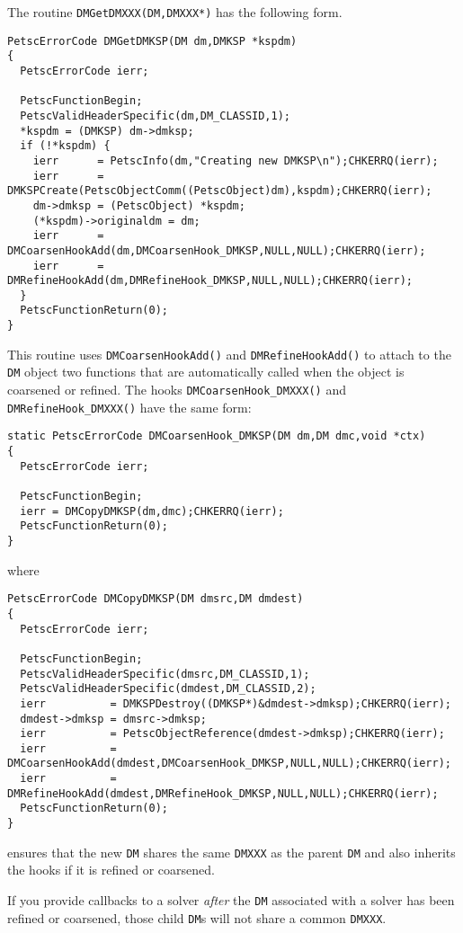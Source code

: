 The routine \lstinline{DMGetDMXXX(DM,DMXXX*)} has the following form.
\begin{lstlisting}
PetscErrorCode DMGetDMKSP(DM dm,DMKSP *kspdm)
{
  PetscErrorCode ierr;

  PetscFunctionBegin;
  PetscValidHeaderSpecific(dm,DM_CLASSID,1);
  *kspdm = (DMKSP) dm->dmksp;
  if (!*kspdm) {
    ierr      = PetscInfo(dm,"Creating new DMKSP\n");CHKERRQ(ierr);
    ierr      = DMKSPCreate(PetscObjectComm((PetscObject)dm),kspdm);CHKERRQ(ierr);
    dm->dmksp = (PetscObject) *kspdm;
    (*kspdm)->originaldm = dm;
    ierr      = DMCoarsenHookAdd(dm,DMCoarsenHook_DMKSP,NULL,NULL);CHKERRQ(ierr);
    ierr      = DMRefineHookAdd(dm,DMRefineHook_DMKSP,NULL,NULL);CHKERRQ(ierr);
  }
  PetscFunctionReturn(0);
}
\end{lstlisting}
This routine uses \lstinline{DMCoarsenHookAdd()} and \lstinline{DMRefineHookAdd()} to attach to the \lstinline{DM} object two functions that are automatically called when the object is coarsened or refined.
The hooks \lstinline{DMCoarsenHook_DMXXX()} and \lstinline{DMRefineHook_DMXXX()} have the same form:
\begin{lstlisting}
static PetscErrorCode DMCoarsenHook_DMKSP(DM dm,DM dmc,void *ctx)
{
  PetscErrorCode ierr;

  PetscFunctionBegin;
  ierr = DMCopyDMKSP(dm,dmc);CHKERRQ(ierr);
  PetscFunctionReturn(0);
}
\end{lstlisting}
where
\begin{lstlisting}
PetscErrorCode DMCopyDMKSP(DM dmsrc,DM dmdest)
{
  PetscErrorCode ierr;

  PetscFunctionBegin;
  PetscValidHeaderSpecific(dmsrc,DM_CLASSID,1);
  PetscValidHeaderSpecific(dmdest,DM_CLASSID,2);
  ierr          = DMKSPDestroy((DMKSP*)&dmdest->dmksp);CHKERRQ(ierr);
  dmdest->dmksp = dmsrc->dmksp;
  ierr          = PetscObjectReference(dmdest->dmksp);CHKERRQ(ierr);
  ierr          = DMCoarsenHookAdd(dmdest,DMCoarsenHook_DMKSP,NULL,NULL);CHKERRQ(ierr);
  ierr          = DMRefineHookAdd(dmdest,DMRefineHook_DMKSP,NULL,NULL);CHKERRQ(ierr);
  PetscFunctionReturn(0);
}
\end{lstlisting}
ensures that the new \lstinline{DM} shares the same \lstinline{DMXXX} as the parent \lstinline{DM} and also inherits the hooks if it is refined or coarsened.

If you provide callbacks to a solver {\em after} the \lstinline{DM} associated with a solver has been refined or coarsened,
those child \lstinline{DM}s will not share a common \lstinline{DMXXX}.

